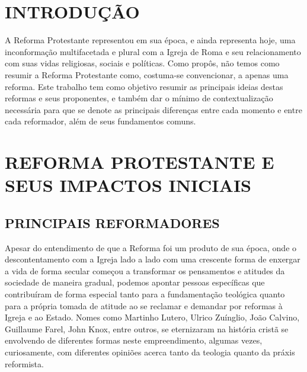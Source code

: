 \documentclass[
    article,            %
	12pt,				%
	oneside,			%
	a4paper,			%
	chapter=TITLE,		%
	section=TITLE,		%
	english,			%
	french,				%
	spanish,			%
	brazil				%
	]{abntex2}
\begin{document}



\imprimircapa

\imprimirfolhaderosto

\tableofcontents*
\cleardoublepage

\textual
\pagestyle{simple}


\section{INTRODUÇÃO}
A Reforma Protestante representou em sua época, e ainda representa hoje, uma inconformação multifacetada e plural com a Igreja de Roma e seu relacionamento com suas vidas religiosas, sociais e políticas. Como  propôs, não temos como resumir a Reforma Protestante como, costuma-se convencionar, a apenas uma reforma. Este trabalho tem como objetivo resumir as principais ideias destas reformas e seus proponentes, e também dar o mínimo de contextualização necessária para que se denote as principais diferenças entre cada momento e entre cada reformador, além de seus fundamentos comuns.

\section{REFORMA PROTESTANTE E SEUS IMPACTOS INICIAIS}

\subsection{PRINCIPAIS REFORMADORES}
Apesar do entendimento de que a Reforma foi um produto de sua época, onde o descontentamento com a Igreja lado a lado com uma crescente forma de enxergar a vida de forma secular começou a transformar os pensamentos e atitudes da sociedade de maneira gradual, podemos apontar pessoas específicas que contribuíram de forma especial tanto para a fundamentação teológica quanto para a própria tomada de atitude ao se reclamar e demandar por reformas à Igreja e ao Estado. Nomes como Martinho Lutero, Ulrico Zuínglio, João Calvino, Guillaume Farel, John Knox, entre outros, se eternizaram na história cristã se envolvendo de diferentes formas neste empreendimento, algumas vezes, curiosamente, com diferentes opiniões acerca tanto da teologia quanto da práxis reformista.
\end{document}
